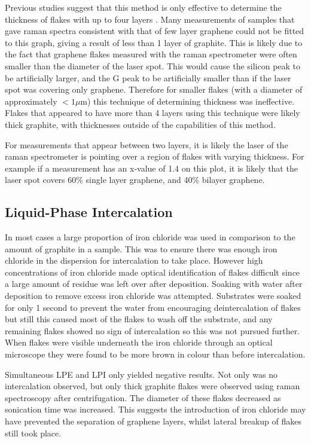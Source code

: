 \documentclass[12pt,titlepage]{article}
\begin{document}
	Previous studies suggest that this method is only effective to determine the thickness of flakes with up to four layers \cite{Khrapach2012a}. Many measurements of samples that gave raman spectra consistent with that of few layer graphene could not be fitted to this graph, giving a result of less than 1 layer of graphite. This is likely due to the fact that graphene flakes measured with the raman spectrometer were often smaller than the diameter of the laser spot. This would cause the silicon peak to be artificially larger, and the G peak to be artificially smaller than if the laser spot was covering only graphene. Therefore for smaller flakes (with a diameter of approximately $<1\mu$m) this technique of determining thickness was ineffective. Flakes that appeared to have more than 4 layers using this technique were likely thick graphite, with thicknesses outside of the capabilities of this method.
	
	For measurements that appear between two layers, it is likely the laser of the raman spectrometer is pointing over a region of flakes with varying thickness. For example if a measurement has an x-value of 1.4 on this plot, it is likely that the laser spot covers 60\% single layer graphene, and 40\% bilayer graphene.
	
	\subsection{Liquid-Phase Intercalation}
	In most cases a large proportion of iron chloride was used in comparison to the amount of graphite in a sample. This was to ensure there was enough iron chloride in the dispersion for intercalation to take place. However high concentrations of iron chloride made optical identification of flakes difficult since a large amount of residue was left over after deposition. Soaking with water after deposition to remove excess iron chloride was attempted. Substrates were soaked for only 1 second to prevent the water from encouraging deintercalation of flakes but still this caused most of the flakes to wash off the substrate, and any remaining flakes showed no sign of intercalation so this was not pursued further. When flakes were visible underneath the iron chloride through an optical microscope they were found to be more brown in colour than before intercalation.
	
	
	Simultaneous LPE and LPI only yielded negative results. Not only was no intercalation observed, but only thick graphite flakes were observed using raman spectroscopy after centrifugation. The diameter of these flakes decreased as sonication time was increased. This suggests the introduction of iron chloride may have prevented the separation of graphene layers, whilst lateral breakup of flakes still took place.
	
\end{document}
